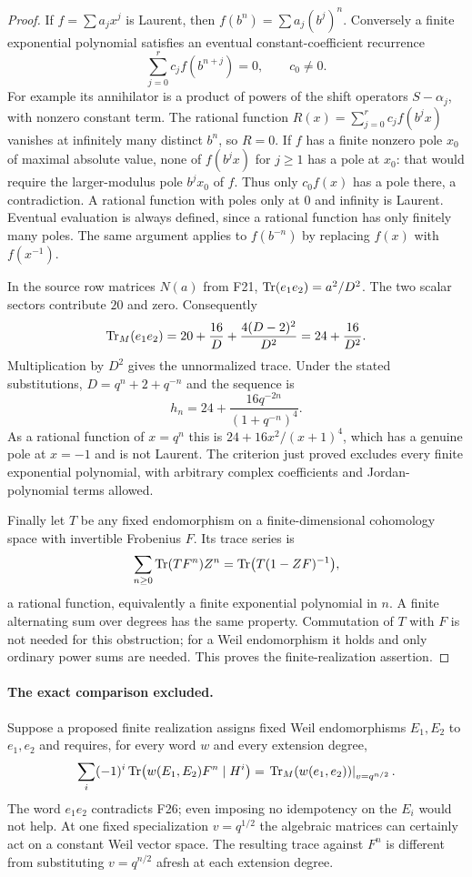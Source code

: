 \documentclass[11pt,a4paper]{article}
\newcommand{\fid}[1]{\textsf{#1}}\newcommand{\gate}[1]{\textsf{#1}}
\theoremstyle{named}\newtheorem{finding}{Finding}[section]
\theoremstyle{definition}\newtheorem{definition}[finding]{Definition}
\theoremstyle{remark}\newtheorem{remark}[finding]{Remark}
\begin{document}
\begin{proof}
If $f=\sum a_jx^j$ is Laurent, then $f(b^n)=\sum a_j(b^j)^n$.
Conversely a finite exponential polynomial satisfies an eventual
constant-coefficient recurrence
\[
 \sum_{j=0}^r c_j f(b^{n+j})=0,\qquad c_0\ne0.
\]
For example its annihilator is a product of powers of the shift
operators $S-\alpha_j$, with nonzero constant term. The rational
function $R(x)=\sum_{j=0}^r c_j f(b^jx)$ vanishes at infinitely many
distinct $b^n$, so $R=0$. If $f$ has a finite nonzero pole $x_0$ of
maximal absolute value, none of $f(b^jx)$ for $j\ge1$ has a pole at
$x_0$: that would require the larger-modulus pole $b^jx_0$ of $f$.
Thus only $c_0f(x)$ has a pole there, a contradiction. A rational
function with poles only at $0$ and infinity is Laurent. Eventual
evaluation is always defined, since a rational function has only
finitely many poles. The same argument applies to $f(b^{-n})$ by
replacing $f(x)$ with $f(x^{-1})$.

In the source row matrices $N(a)$ from \fid{F21},
$\operatorname{Tr}(e_1e_2)=a^2/D^2$. The two scalar sectors contribute $20$ and zero.
Consequently
\[
 \operatorname{Tr}_M(e_1e_2)
 =20+\frac{16}{D}+\frac{4(D-2)^2}{D^2}
 =24+\frac{16}{D^2}.
\]
Multiplication by $D^2$ gives the unnormalized trace. Under the stated
substitutions, $D=q^n+2+q^{-n}$ and the sequence is
\[
 h_n=24+\frac{16q^{-2n}}{(1+q^{-n})^4}.
\]
As a rational function of $x=q^n$ this is
$24+16x^2/(x+1)^4$, which has a genuine pole at $x=-1$ and is not
Laurent. The criterion just proved excludes every finite exponential
polynomial, with arbitrary complex coefficients and Jordan-polynomial
terms allowed.

Finally let $T$ be any fixed endomorphism on a finite-dimensional
cohomology space with invertible Frobenius $F$. Its trace series is
\[
 \sum_{n\ge0}\operatorname{Tr}(TF^n)Z^n
 =\operatorname{Tr}\bigl(T(1-ZF)^{-1}\bigr),
\]
a rational function, equivalently a finite exponential polynomial in
$n$. A finite alternating sum over degrees has the same property.
Commutation of $T$ with $F$ is not needed for this obstruction; for a
Weil endomorphism it holds and only ordinary power sums are needed.
This proves the finite-realization assertion.
\end{proof}

\paragraph{The exact comparison excluded.}
Suppose a proposed finite realization assigns fixed Weil endomorphisms
$E_1,E_2$ to $e_1,e_2$ and requires, for every word $w$ and every
extension degree,
\[
 \sum_i(-1)^i\operatorname{Tr}\bigl(w(E_1,E_2)F^n\mid H^i\bigr)
 =\left.\operatorname{Tr}_M(w(e_1,e_2))\right|_{v=q^{n/2}}.
\]
The word $e_1e_2$ contradicts \fid{F26}; even imposing no idempotency
on the $E_i$ would not help. At one fixed specialization
$v=q^{1/2}$ the algebraic matrices can certainly act on a constant
Weil vector space. The resulting trace against $F^n$ is different
from substituting $v=q^{n/2}$ afresh at each extension degree.
\end{document}
